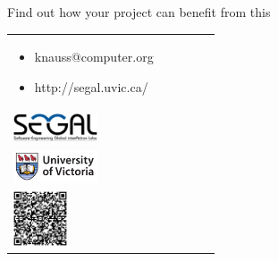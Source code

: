 \documentclass[final]{beamer} %
\begin{document}
\begin{frame}{}
\begin{columns}[b]
\begin{column}{0.97\linewidth}
    \begin{block}{Find out how your project can benefit from this}
    \begin{tabular}{v{.45\linewidth}V{0.23\linewidth}V{0.23\linewidth}}
 \vspace{-0.5cm}
    \begin{itemize}
    \item knauss{@}computer.org
    \item http://segal.uvic.ca/
    \end{itemize}
& ~\\ \vspace{-0.5cm}
    \includegraphics[width=2.5cm]{img/segal-logo_wbg} \\  %
    \includegraphics[width=2.5cm]{img/uvic-logo_wbg}
& ~\\ \vspace{-0.5cm}
   \includegraphics[width=1.6cm]{img/segalqrcode}
 \end{tabular}
 
  \vspace{-0.6cm}

   
  \end{block}

  \end{column}
\end{columns}  

\vfill
\end{frame}

  
\end{document}
